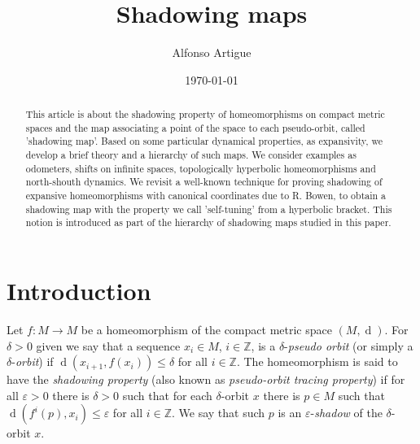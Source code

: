 \documentclass[12pt]{amsart}
\theoremstyle{plain}
\theoremstyle{definition}
\theoremstyle{remark}
\DeclareMathOperator{\dist}{d}
\newcommand{\Z}{\mathbb Z}
\renewcommand{\epsilon}{\varepsilon}
\begin{document}
\title{Shadowing maps}

\author{Alfonso Artigue}
\address{Departamento de Matemática y Estadística del Litoral\\
Centro Universitario Regional Litoral Norte\\
Universidad de la Rep\'ublica\\
Florida 1065, Paysandú, Uruguay.\\}

\date{\today}
\begin{abstract}
	This article is about the shadowing property of homeomorphisms on compact metric spaces and the map associating a point of the space to each pseudo-orbit, called 'shadowing map'. Based on some particular dynamical properties, as expansivity, we develop a brief theory and a hierarchy
	of such maps. We consider examples as odometers, shifts on infinite spaces, topologically hyperbolic homeomorphisms and north-shouth dynamics.
	We revisit a well-known technique for proving shadowing of expansive homeomorphisms with canonical coordinates due to R. Bowen, to obtain a  shadowing map with the property we call 'self-tuning' from a hyperbolic bracket. This notion is introduced as part of the hierarchy of shadowing maps studied in this paper.
\end{abstract}
\maketitle


\section{Introduction}
\label{secIntro}
Let $f\colon M\to M$ be a homeomorphism of the compact metric space $(M,\dist)$.
For $\delta>0$ given we say that a sequence $x_i\in M$, $i\in\Z$, is a $\delta$-\textit{pseudo orbit} (or simply a $\delta$-\textit{orbit}) if
$\dist(x_{i+1},f(x_i))\leq\delta$ for all $i\in\Z$.
The homeomorphism is said to have the \textit{shadowing property} (also known as \textit{pseudo-orbit tracing property}) if for all $\epsilon>0$ there is $\delta>0$ such that for each $\delta$-orbit $x$ there is $p\in M$ such that
$\dist(f^i(p),x_i)\leq\epsilon$ for all $i\in\Z$.
We say that such $p$ is an $\epsilon$-\textit{shadow} of the $\delta$-orbit $x$.
\end{document}
